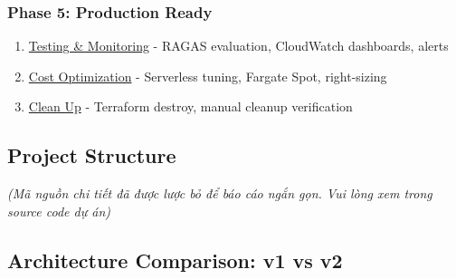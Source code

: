 \hypertarget{phase-5-production-ready}{%
\subsubsection{Phase 5: Production
Ready}}

\begin{enumerate}
\def\labelenumi{\arabic{enumi}.}
\setcounter{enumi}{14}
\tightlist
\item
  \href{5.15-Testing/}{Testing \& Monitoring} - RAGAS evaluation,
  CloudWatch dashboards, alerts
\item
  \href{5.16-Cost/}{Cost Optimization} - Serverless tuning, Fargate
  Spot, right-sizing
\item
  \href{5.17-Cleanup/}{Clean Up} - Terraform destroy, manual cleanup
  verification
\end{enumerate}

\hypertarget{project-structure}{%
\subsection{Project Structure}}

\emph{(Mã nguồn chi tiết đã được lược bỏ để báo cáo ngắn gọn. Vui lòng
xem trong source code dự án)}

\hypertarget{architecture-comparison-v1-vs-v2}{%
\subsection{Architecture Comparison: v1 vs
v2}}

